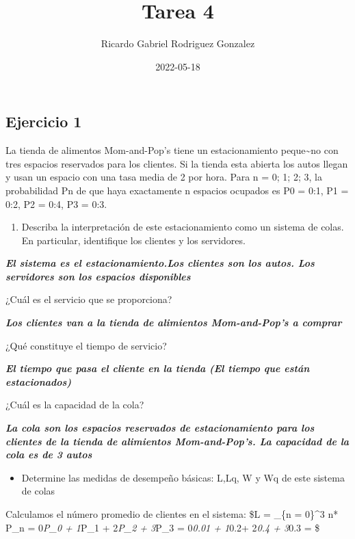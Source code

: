\documentclass[
]{article}
\title{Tarea 4}
\author{Ricardo Gabriel Rodriguez Gonzalez}
\date{2022-05-18}
\providecommand{\tightlist}{%
  \setlength{\itemsep}{0pt}\setlength{\parskip}{0pt}}
\begin{document}
\maketitle

\hypertarget{ejercicio-1}{%
\subsection{Ejercicio 1}\label{ejercicio-1}}

La tienda de alimentos Mom-and-Pop's tiene un estacionamiento
peque\textasciitilde no con tres espacios reservados para los clientes.
Si la tienda esta abierta los autos llegan y usan un espacio con una
tasa media de 2 por hora. Para n = 0; 1; 2; 3, la probabilidad Pn de que
haya exactamente n espacios ocupados es P0 = 0:1, P1 = 0:2, P2 = 0:4, P3
= 0:3.

\begin{enumerate}
\def\labelenumi{\alph{enumi})}
\tightlist
\item
  Describa la interpretación de este estacionamiento como un sistema de
  colas. En particular, identifique los clientes y los servidores.
\end{enumerate}

\textbf{\emph{El sistema es el estacionamiento.Los clientes son los
autos. Los servidores son los espacios disponibles}}

¿Cuál es el servicio que se proporciona?

\textbf{\emph{Los clientes van a la tienda de alimientos Mom-and-Pop's a
comprar}}

¿Qué constituye el tiempo de servicio?

\textbf{\emph{El tiempo que pasa el cliente en la tienda (El tiempo que
están estacionados)}}

¿Cuál es la capacidad de la cola?

\textbf{\emph{La cola son los espacios reservados de estacionamiento
para los clientes de la tienda de alimientos Mom-and-Pop's. La capacidad
de la cola es de 3 autos}}

\begin{itemize}
\tightlist
\item
  Determine las medidas de desempeño básicas: L,Lq, W y Wq de este
  sistema de colas
\end{itemize}

Calculamos el número promedio de clientes en el sistema: \$L =
\displaystyle\sum\_\{n = 0\}\^{}3 n* P\_n = 0\emph{P\_0 + 1}P\_1 +
2\emph{P\_2 + 3}P\_3 = 0\emph{0.01 + 1}0.2+ 2\emph{0.4 + 3}0.3 = \$
\end{document}
